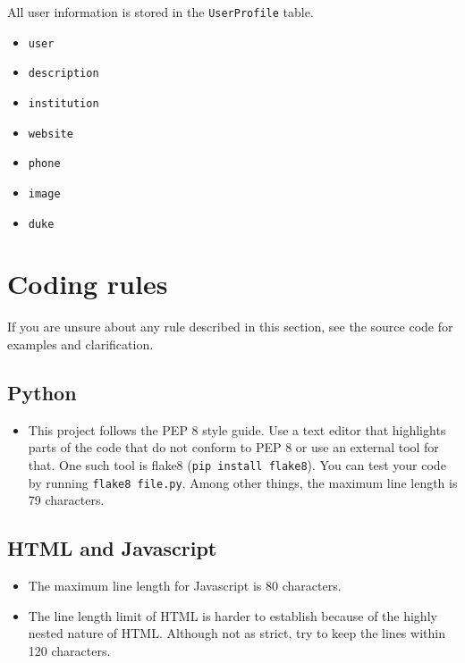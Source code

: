 \documentclass{article}
\begin{document}
All user information is stored in the \texttt{UserProfile} table.
\begin{tcolorbox}[colback=green!5,colframe=green!40!black,title=UserProfile]
  \begin{itemize}
  \item \texttt{user}
  \item \texttt{description}
  \item \texttt{institution}
  \item \texttt{website}
  \item \texttt{phone}
  \item \texttt{image}
  \item \texttt{duke}
  \end{itemize}
\end{tcolorbox}

\section{Coding rules}

If you are unsure about any rule described in this section, see the source code for examples and clarification.

\subsection{Python}

\begin{itemize}
\item This project follows the PEP 8 style guide. Use a text editor that highlights parts of the code that do not conform to PEP 8 or use an external tool for that. One such tool is flake8 (\texttt{pip install flake8}). You can test your code by running \texttt{flake8 file.py}. Among other things, the maximum line length is 79 characters.
\end{itemize}

\subsection{HTML and Javascript}

\begin{itemize}
\item The maximum line length for Javascript is 80 characters.
\item The line length limit of HTML is harder to establish because of the highly nested nature of HTML. Although not as strict, try to keep the lines within 120 characters.
\end{itemize}
\end{document}
